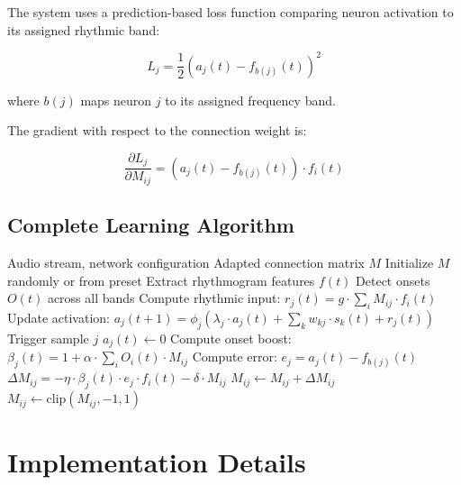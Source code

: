 \documentclass[11pt,a4paper]{article}
\begin{document}
The system uses a prediction-based loss function comparing neuron activation to its assigned rhythmic band:

\begin{equation}
L_j = \frac{1}{2}\left(a_j(t) - f_{b(j)}(t)\right)^2
\end{equation}

\noindent where $b(j)$ maps neuron $j$ to its assigned frequency band.

The gradient with respect to the connection weight is:

\begin{equation}
\frac{\partial L_j}{\partial M_{ij}} = \left(a_j(t) - f_{b(j)}(t)\right) \cdot f_i(t)
\end{equation}

\subsection{Complete Learning Algorithm}

\begin{algorithm}
\caption{Onset-Modulated Rhythmogram Learning}
\begin{algorithmic}[1]
\REQUIRE Audio stream, network configuration
\ENSURE Adapted connection matrix $M$
\STATE Initialize $M$ randomly or from preset
    \STATE Extract rhythmogram features $f(t)$
    \STATE Detect onsets $O(t)$ across all bands
        \STATE Compute rhythmic input: $r_j(t) = g \cdot \sum_i M_{ij} \cdot f_i(t)$
        \STATE Update activation: $a_j(t+1) = \phi_j(\lambda_j \cdot a_j(t) + \sum_k w_{kj} \cdot s_k(t) + r_j(t))$
            \STATE Trigger sample $j$
            \STATE $a_j(t) \leftarrow 0$
        \ENDIF
            \STATE Compute onset boost: $\beta_j(t) = 1 + \alpha \cdot \sum_i O_i(t) \cdot M_{ij}$
            \STATE Compute error: $e_j = a_j(t) - f_{b(j)}(t)$
                \STATE $\Delta M_{ij} = -\eta \cdot \beta_j(t) \cdot e_j \cdot f_i(t) - \delta \cdot M_{ij}$
                \STATE $M_{ij} \leftarrow M_{ij} + \Delta M_{ij}$
                \STATE $M_{ij} \leftarrow \text{clip}(M_{ij}, -1, 1)$
            \ENDFOR
        \ENDIF
    \ENDFOR
\ENDFOR
\end{algorithmic}
\end{algorithm}

\section{Implementation Details}
\end{document}
